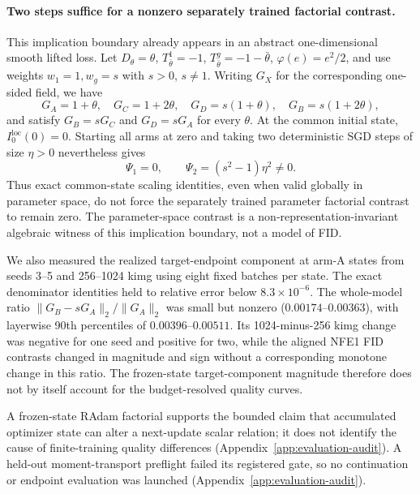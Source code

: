 \documentclass{article}
\newif\ifshowcomments
\newcommand{\claimnote}[1]{%
  \ifshowcomments{\color{claimpurple}\textbf{[CLAIM CEILING: #1]}}\fi}
\begin{document}
\claimnote{Use the recurrence only for the non-implication from matched-state
identities to separately trained factorial contrasts. The observed contraction
is empirical and currently lacks a theory-level mechanism claim.}

\paragraph{Two steps suffice for a nonzero separately trained factorial
contrast.}
This implication boundary already appears in an abstract one-dimensional
smooth lifted loss. Let
$D_\theta=\theta$, $T^1_{\bar\theta}=-1$,
$T^g_{\bar\theta}=-1-\bar\theta$,
$\varphi(e)=e^2/2$, and use weights $w_1=1,w_g=s$ with $s>0$, $s\neq1$.
Writing $G_X$ for the corresponding one-sided field, we have
\begin{equation}
  G_A=1+\theta,\quad G_C=1+2\theta,\quad
  G_D=s(1+\theta),\quad G_B=s(1+2\theta),
  \label{eq:two-step-vector-fields}
\end{equation}
and satisfy $G_B=sG_C$ and $G_D=sG_A$ for every $\theta$. At the common initial
state, $I_0^{\mathrm{loc}}(0)=0$. Starting all arms at zero and taking two
deterministic SGD steps of size $\eta>0$ nevertheless gives
\begin{equation}
  \Psi_1=0,
  \qquad
  \Psi_2=(s^2-1)\eta^2\neq0.
  \label{eq:two-step-nonadditivity}
\end{equation}
Thus exact common-state scaling identities, even when valid globally in
parameter space, do not force the separately trained parameter factorial
contrast to remain zero. The parameter-space contrast is a
non-representation-invariant algebraic witness of this implication boundary,
not a model of FID.

We also measured the realized target-endpoint component at arm-A states from
seeds 3--5 and 256--1024 kimg using eight fixed batches per state. The exact
denominator identities held to relative error below $8.3\times10^{-6}$. The
whole-model ratio
$\lVert G_B-sG_A\rVert_2/\lVert G_A\rVert_2$ was small but nonzero
($0.00174$--$0.00363$), with layerwise 90th percentiles of
$0.00396$--$0.00511$. Its 1024-minus-256 kimg change was negative for one seed
and positive for two, while the aligned NFE1 FID contrasts changed in magnitude
and sign without a corresponding monotone change in this ratio. The frozen-state
target-component magnitude therefore does not by itself account for the
budget-resolved quality curves.

A frozen-state RAdam factorial supports the bounded claim that accumulated
optimizer state can alter a next-update scalar relation; it does not identify
the cause of finite-training quality differences
(Appendix~\ref{app:evaluation-audit}). A held-out moment-transport preflight
failed its registered gate, so no continuation or endpoint evaluation was
launched (Appendix~\ref{app:evaluation-audit}).
\end{document}
